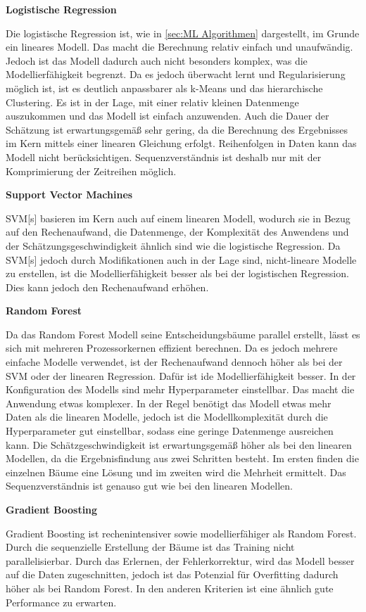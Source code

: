\textbf{Logistische Regression}\par
Die logistische Regression ist, wie in \autoref{sec:ML Algorithmen} dargestellt, im Grunde ein lineares Modell. Das macht die Berechnung relativ einfach und unaufwändig. Jedoch ist das Modell dadurch auch nicht besonders komplex, was die Modellierfähigkeit begrenzt. Da es jedoch überwacht lernt und Regularisierung möglich ist, ist es deutlich anpassbarer als k-Means und das hierarchische Clustering. Es ist in der Lage, mit einer relativ kleinen Datenmenge auszukommen und das Modell ist einfach anzuwenden. Auch die Dauer der Schätzung ist erwartungsgemäß sehr gering, da die Berechnung des Ergebnisses im Kern mittels einer linearen Gleichung erfolgt. Reihenfolgen in Daten kann das Modell nicht berücksichtigen. Sequenzverständnis ist deshalb nur mit der Komprimierung der Zeitreihen möglich.\dubpar

\textbf{Support Vector Machines}\par
\acrshort{SVM}[s] basieren im Kern auch auf einem linearen Modell, wodurch sie in Bezug auf den Rechenaufwand, die Datenmenge, der Komplexität des Anwendens und der Schätzungsgeschwindigkeit ähnlich sind wie die logistische Regression. Da \acrshort{SVM}[s] jedoch durch Modifikationen auch in der Lage sind, nicht-lineare Modelle zu erstellen, ist die Modellierfähigkeit besser als bei der logistischen Regression. Dies kann jedoch den Rechenaufwand erhöhen.\dubpar

\textbf{Random Forest}\par
Da das Random Forest Modell seine Entscheidungsbäume parallel erstellt, lässt es sich mit mehreren Prozessorkernen effizient berechnen. Da es jedoch mehrere einfache Modelle verwendet, ist der Rechenaufwand dennoch höher als bei der \acrshort{SVM} oder der linearen Regression. Dafür ist ide Modellierfähigkeit besser. In der Konfiguration des Modells sind mehr Hyperparameter einstellbar. Das macht die Anwendung etwas komplexer. In der Regel benötigt das Modell etwas mehr Daten als die linearen Modelle, jedoch ist die Modellkomplexität durch die Hyperparameter gut einstellbar, sodass eine geringe Datenmenge ausreichen kann. Die Schätzgeschwindigkeit ist erwartungsgemäß höher als bei den linearen Modellen, da die Ergebnisfindung aus zwei Schritten besteht. Im ersten finden die einzelnen Bäume eine Lösung und im zweiten wird die Mehrheit ermittelt. Das Sequenzverständnis ist genauso gut wie bei den linearen Modellen.\dubpar

\textbf{Gradient Boosting}\par
Gradient Boosting ist rechenintensiver sowie modellierfähiger als Random Forest. Durch die sequenzielle Erstellung der Bäume ist das Training nicht parallelisierbar. Durch das Erlernen, der Fehlerkorrektur, wird das Modell besser auf die Daten zugeschnitten, jedoch ist das Potenzial für Overfitting dadurch höher als bei Random Forest. In den anderen Kriterien ist eine ähnlich gute Performance zu erwarten.\dubpar

